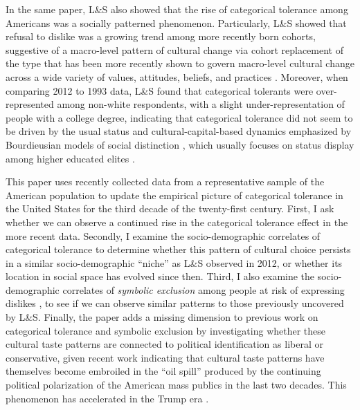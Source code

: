\documentclass[12pt]{article}
\begin{document}
In the same paper, L\&S also showed that the rise of categorical tolerance among Americans was a socially patterned phenomenon. Particularly, L\&S showed that refusal to dislike was a growing trend among more recently born cohorts, suggestive of a macro-level pattern of cultural change via cohort replacement of the type that has been more recently shown to govern macro-level cultural change across a wide variety of values, attitudes, beliefs, and practices \citep{vaisey2016cultural-867, kiley2020measuring-123, ochoa2024opinions-856, vaisey2021model-based-deb}. Moreover, when comparing 2012 to 1993 data, L\&S found that categorical tolerants were over-represented among non-white respondents, with a slight under-representation of people with a college degree, indicating that categorical tolerance did not seem to be driven by the usual status and cultural-capital-based dynamics emphasized by Bourdieusian models of social distinction \citep{bourdieu1984distinction-835}, which usually focuses on status display among higher educated elites \citep{jarness2017im-001, khan2011privilege-68a}.

This paper uses recently collected data from a representative sample of the American population to update the empirical picture of categorical tolerance in the United States for the third decade of the twenty-first century. First, I ask whether we can observe a continued rise in the categorical tolerance effect in the more recent data. Secondly, I examine the socio-demographic correlates of categorical tolerance to determine whether this pattern of cultural choice persists in a similar socio-demographic ``niche'' \citep{mcpherson2004blau-9fe} as L\&S observed in 2012, or whether its location in social space has evolved since then. Third, I also examine the socio-demographic correlates of \textit{symbolic exclusion} among people at risk of expressing dislikes \citep{bryson1996anything-311}, to see if we can observe similar patterns to those previously uncovered by L\&S. Finally, the paper adds a missing dimension to previous work on categorical tolerance and symbolic exclusion by investigating whether these cultural taste patterns are connected to political identification as liberal or conservative, given recent work indicating that cultural taste patterns have themselves become embroiled in the ``oil spill'' produced by the continuing political polarization of the American mass publics in the last two decades. This phenomenon has accelerated in the Trump era \citep{dellaposta2020pluralistic-ed4, rawlings2023polarization-0af}.
\end{document}
